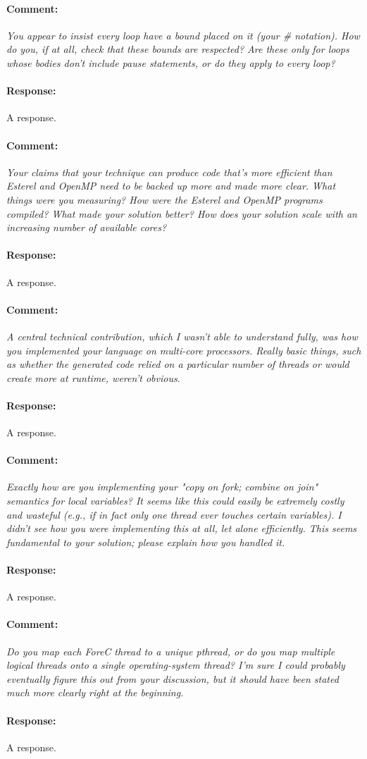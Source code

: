 \documentclass[a4paper,11pt]{article}
\newenvironment{comment}{\paragraph{Comment:}\em}{}
\newenvironment{response}{\paragraph{Response:}}{}
\begin{document}
\begin{comment}
	You appear to insist every loop have a bound placed on it
	(your \# notation). How do you, if at all, check that these
	bounds are respected? Are these only for loops whose bodies
	don't include pause statements, or do they apply to every
	loop?
\end{comment}
\begin{response}
	A response.
\end{response}

\begin{comment}
	Your claims that your technique can produce code that's more
	efficient than Esterel and OpenMP need to be backed up
	more and made more clear. What things were you measuring?
	How were the Esterel and OpenMP programs compiled? What made
	your solution better? How does your solution scale with an
	increasing number of available cores?
\end{comment}
\begin{response}
	A response.
\end{response}

\begin{comment}
	A central technical contribution, which I wasn't able to
	understand fully, was how you implemented your language on
	multi-core processors. Really basic things, such as whether
	the generated code relied on a particular number of threads
	or would create more at runtime, weren't obvious.
\end{comment}
\begin{response}
	A response.
\end{response}

\begin{comment}
	Exactly how are you implementing your "copy on fork; combine
	on join" semantics for local variables? It seems like this
	could easily be extremely costly and wasteful (e.g., if in
	fact only one thread ever touches certain variables). I didn't
	see how you were implementing this at all, let alone
	efficiently. This seems fundamental to your solution; please
	explain how you handled it.
\end{comment}
\begin{response}
	A response.
\end{response}

\begin{comment}
	Do you map each ForeC thread to a unique pthread, or do you
	map multiple logical threads onto a single operating-system
	thread? I'm sure I could probably eventually figure this out
	from your discussion, but it should have been stated much
	more clearly right at the beginning.
\end{comment}
\begin{response}
	A response.
\end{response}
\end{document}

